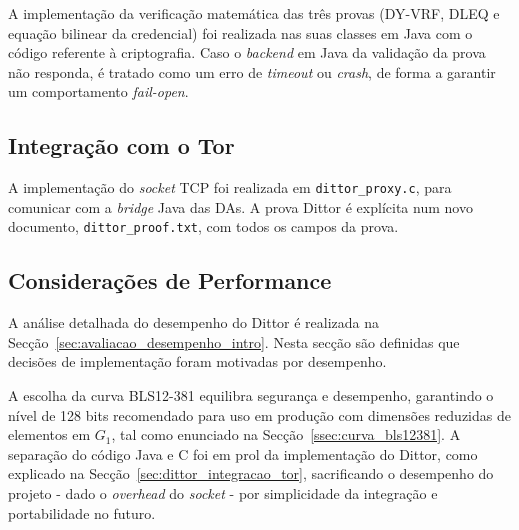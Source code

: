 A implementação da verificação matemática das três provas (DY-VRF, DLEQ e equação bilinear da credencial) foi realizada nas suas classes em Java com o código referente à criptografia. Caso o \textit{backend} em Java da validação da prova não responda, é tratado como um erro de \textit{timeout} ou \textit{crash}, de forma a garantir um comportamento \textit{fail-open}.

\subsection{Integração com o Tor}
\label{sub:dittor_impl_integracao_tor}

A implementação do \textit{socket} TCP foi realizada em \texttt{dittor\_proxy.c}, para comunicar com a \textit{bridge} Java das DAs. A prova Dittor é explícita num novo documento, \texttt{dittor\_proof.txt}, com todos os campos da prova.

\subsection{Considerações de Performance}
\label{sub:dittor_impl_performance}

A análise detalhada do desempenho do Dittor é realizada na Secção~\ref{sec:avaliacao_desempenho_intro}. Nesta secção são definidas que decisões de implementação foram motivadas por desempenho.

A escolha da curva BLS12-381 equilibra segurança e desempenho, garantindo o nível de 128 bits recomendado para uso em produção com dimensões reduzidas de elementos em $G_1$, tal como enunciado na Secção~\ref{ssec:curva_bls12381}. A separação do código Java e C foi em prol da implementação do Dittor, como explicado na Secção~\ref{sec:dittor_integracao_tor}, sacrificando o desempenho do projeto - dado o \textit{overhead} do \textit{socket} - por simplicidade da integração e portabilidade no futuro.